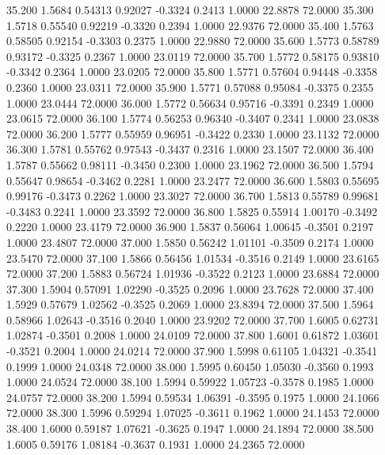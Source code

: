   35.200   1.5684   0.54313   0.92027  -0.3324   0.2413   1.0000  22.8878  72.0000
  35.300   1.5718   0.55540   0.92219  -0.3320   0.2394   1.0000  22.9376  72.0000
  35.400   1.5763   0.58505   0.92154  -0.3303   0.2375   1.0000  22.9880  72.0000
  35.600   1.5773   0.58789   0.93172  -0.3325   0.2367   1.0000  23.0119  72.0000
  35.700   1.5772   0.58175   0.93810  -0.3342   0.2364   1.0000  23.0205  72.0000
  35.800   1.5771   0.57604   0.94448  -0.3358   0.2360   1.0000  23.0311  72.0000
  35.900   1.5771   0.57088   0.95084  -0.3375   0.2355   1.0000  23.0444  72.0000
  36.000   1.5772   0.56634   0.95716  -0.3391   0.2349   1.0000  23.0615  72.0000
  36.100   1.5774   0.56253   0.96340  -0.3407   0.2341   1.0000  23.0838  72.0000
  36.200   1.5777   0.55959   0.96951  -0.3422   0.2330   1.0000  23.1132  72.0000
  36.300   1.5781   0.55762   0.97543  -0.3437   0.2316   1.0000  23.1507  72.0000
  36.400   1.5787   0.55662   0.98111  -0.3450   0.2300   1.0000  23.1962  72.0000
  36.500   1.5794   0.55647   0.98654  -0.3462   0.2281   1.0000  23.2477  72.0000
  36.600   1.5803   0.55695   0.99176  -0.3473   0.2262   1.0000  23.3027  72.0000
  36.700   1.5813   0.55789   0.99681  -0.3483   0.2241   1.0000  23.3592  72.0000
  36.800   1.5825   0.55914   1.00170  -0.3492   0.2220   1.0000  23.4179  72.0000
  36.900   1.5837   0.56064   1.00645  -0.3501   0.2197   1.0000  23.4807  72.0000
  37.000   1.5850   0.56242   1.01101  -0.3509   0.2174   1.0000  23.5470  72.0000
  37.100   1.5866   0.56456   1.01534  -0.3516   0.2149   1.0000  23.6165  72.0000
  37.200   1.5883   0.56724   1.01936  -0.3522   0.2123   1.0000  23.6884  72.0000
  37.300   1.5904   0.57091   1.02290  -0.3525   0.2096   1.0000  23.7628  72.0000
  37.400   1.5929   0.57679   1.02562  -0.3525   0.2069   1.0000  23.8394  72.0000
  37.500   1.5964   0.58966   1.02643  -0.3516   0.2040   1.0000  23.9202  72.0000
  37.700   1.6005   0.62731   1.02874  -0.3501   0.2008   1.0000  24.0109  72.0000
  37.800   1.6001   0.61872   1.03601  -0.3521   0.2004   1.0000  24.0214  72.0000
  37.900   1.5998   0.61105   1.04321  -0.3541   0.1999   1.0000  24.0348  72.0000
  38.000   1.5995   0.60450   1.05030  -0.3560   0.1993   1.0000  24.0524  72.0000
  38.100   1.5994   0.59922   1.05723  -0.3578   0.1985   1.0000  24.0757  72.0000
  38.200   1.5994   0.59534   1.06391  -0.3595   0.1975   1.0000  24.1066  72.0000
  38.300   1.5996   0.59294   1.07025  -0.3611   0.1962   1.0000  24.1453  72.0000
  38.400   1.6000   0.59187   1.07621  -0.3625   0.1947   1.0000  24.1894  72.0000
  38.500   1.6005   0.59176   1.08184  -0.3637   0.1931   1.0000  24.2365  72.0000
